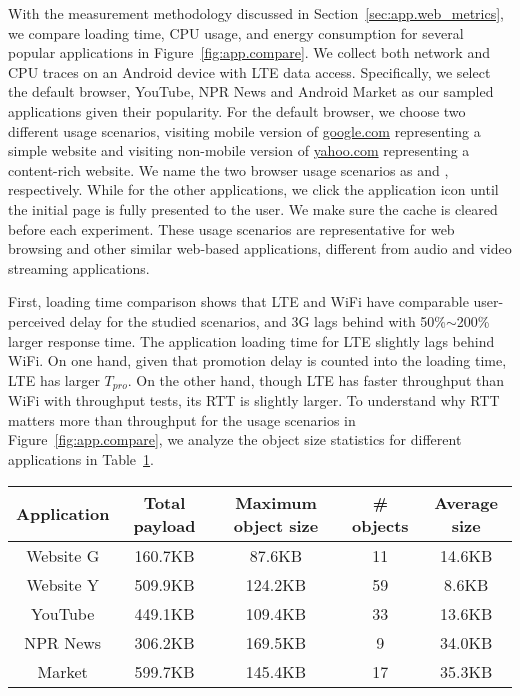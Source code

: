 With the measurement methodology discussed in Section~\ref{sec:app.web_metrics}, we compare loading time, CPU usage, and energy consumption for several popular applications in Figure~\ref{fig:app.compare}. We collect both network and CPU traces on an Android device with LTE data access. Specifically, we select the default browser, YouTube, NPR News and Android Market as our sampled applications given their popularity. For the default browser, we choose two different usage scenarios, \ie visiting mobile version of \url{google.com} representing a simple website and visiting non-mobile version of \url{yahoo.com} representing a content-rich website. We name the two browser usage scenarios as \WG and \WY, respectively. While for the other applications, we click the application icon until the initial page is fully presented to the user. We make sure the cache is cleared before each experiment. These usage scenarios are representative for web browsing and other similar web-based applications, different from audio and video streaming applications.

First, loading time comparison shows that LTE and WiFi have comparable user-perceived delay for the studied scenarios, and 3G lags behind with 50\%$\sim$200\% larger response time. The application loading time for LTE slightly lags behind WiFi. On one hand, given that promotion delay is counted into the loading time, LTE has larger $T_{pro}$. On the other hand, though LTE has faster throughput than WiFi with throughput tests, its RTT is slightly larger. To understand why RTT matters more than throughput for the usage scenarios in Figure~\ref{fig:app.compare}, we analyze the object size statistics for different applications in Table~\ref{tab:app.size}.

\begin{table}[t]
\begin{center}
\begin{tabular}{|c|c|c|c|c|}\hline
Application & Total payload & Maximum object size & \# objects & Average size \\\hline
Website G & 160.7KB & 87.6KB & 11 & 14.6KB\\\hline
Website Y & 509.9KB & 124.2KB & 59 & 8.6KB\\\hline
YouTube & 449.1KB & 109.4KB & 33 & 13.6KB\\\hline
NPR News & 306.2KB & 169.5KB & 9 & 34.0KB\\\hline
Market & 599.7KB & 145.4KB & 17 & 35.3KB\\\hline
\end{tabular}
\label{tab:app.size}
\end{center}
\end{table}

